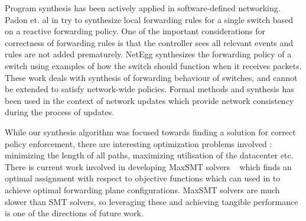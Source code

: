Program synthesis has been actively applied in software-defined networking. Padon et. al in \cite{decentralize} try to synthesize local forwarding rules for a single switch based on a reactive forwarding policy. One of the important considerations for correctness of forwarding rules is that the controller sees 
all relevant events and rules are not added prematurely. NetEgg \cite{netegg} synthesizes the forwarding policy of a switch using examples of how the switch 
should function when it receives packets. These work deals with synthesis of forwarding behaviour of switches, and cannot be extended to satisfy network-wide policies.  Formal methods and synthesis has 
been used in the context of network updates \cite{updates, customconsistency} which provide network consistency during the process of updates. 


While our synthesis algorithm was focused towards finding a solution for correct policy enforcement,
 there are interesting optimization problems involved : minimizing the length of all paths, maximizing utilisation of the 
 datacenter etc. There is current work involved in developing MaxSMT solvers ~\cite{z3maxSMT} which finds an optimal assignment
 with respect to objective functions which can used in \Name to achieve optimal forwarding plane configurations. MaxSMT solvers
 are much slower than SMT solvers, so leveraging these and achieving tangible performance is one of the directions of future work.
 
